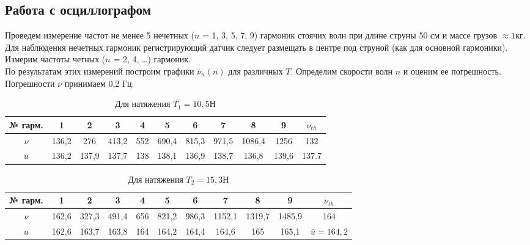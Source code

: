 \documentclass[13pt,a4paper]{article}
\begin{document}
\subsection{Работа с осциллографом}
Проведем измерение частот не менее 5 нечетных ($n$ = 1, 3, 5, 7, 9) гармоник стоячих волн при длине струны 50 см и массе грузов $\approx1$кг. Для наблюдения нечетных гармоник регистрирующий датчик следует размещать в центре под струной (как для основной гармоники).\\


Измерим частоты четных ($n$ = 2, 4, …) гармоник.\\

По результатам этих измерений построим графики $\nu_{n}(n)$ для различных $T$. Определим скорости волн $n$ и оценим ее погрешность. Погрешности $\nu$ принимаем 0,2 Гц.

\begin{table}[h!]
\begin{center}
				\begin{tabular}{| c | c | c | c | c | c | c | c | c | c | c |}
					\hline
					№ гарм. & 1 & 2 & 3 & 4 & 5 & 6 & 7 & 8 & 9 & $\nu_{th}$ \\ \hline
					$\nu$ & 136,2 & 276 & 413,2 & 552 & 690,4 & 815,3 & 971,5 & 1086,4 & 1256 & 132 \\ \hline
					 $u$ & 136,2 & 137,9 & 137,7 & 138 & 138,1 & 136,9 & 138,7 & 136,8 & 139,6& 137.7 \\ \hline
				\end{tabular}
				\caption{Для натяжения $T_{1}=10,5$Н}
				\label{tab:mass_of_load_for_all_measuring}
			\end{center}
\end{table}


\begin{table}[h!]
\begin{center}
				\begin{tabular}{| c | c | c | c | c | c | c | c | c | c | c |}
					\hline
					№ гарм. & 1 & 2 & 3 & 4 & 5 & 6 & 7 & 8 & 9 & $\nu_{th}$\\ \hline
					$\nu$ & 162,6 & 327,3 & 491,4 & 656 & 821,2 & 986,3 & 1152,1 & 1319,7 & 1485,9 & 164 \\ \hline
					 $u$ & 162,6 & 163,7 & 163,8 & 164 & 164,2 & 164,4 & 164,6 & 165 & 165,1 &$\bar{u}=164,2$\\ \hline
				\end{tabular}
				\caption{Для натяжения $T_{2}=15,3$Н}
				\label{tab:mass_of_load_for_all_measuring2}
			\end{center}
\end{table}
\end{document}
